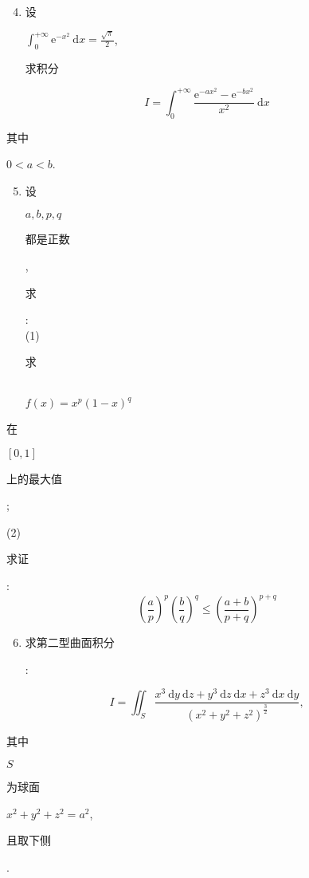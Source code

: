 \documentclass[10pt]{article}
\begin{document}
\begin{enumerate}
  \setcounter{enumi}{3}
  \item \begin{CJK}{UTF8}{mj}设\end{CJK} $\int_{0}^{+\infty} \mathrm{e}^{-x^{2}} \mathrm{~d} x=\frac{\sqrt{\pi}}{2}$, \begin{CJK}{UTF8}{mj}求积分\end{CJK}
\end{enumerate}
$$
I=\int_{0}^{+\infty} \frac{\mathrm{e}^{-a x^{2}}-\mathrm{e}^{-b x^{2}}}{x^{2}} \mathrm{~d} x
$$
\begin{CJK}{UTF8}{mj}其中\end{CJK} $0<a<b$.

\begin{enumerate}
  \setcounter{enumi}{4}
  \item \begin{CJK}{UTF8}{mj}设\end{CJK} $a, b, p, q$ \begin{CJK}{UTF8}{mj}都是正数\end{CJK}, \begin{CJK}{UTF8}{mj}求\end{CJK}:\\
(1) \begin{CJK}{UTF8}{mj}求\end{CJK}\\
$f(x)=x^{p}(1-x)^{q}$
\end{enumerate}
\begin{CJK}{UTF8}{mj}在\end{CJK} $[0,1]$ \begin{CJK}{UTF8}{mj}上的最大值\end{CJK};

(2) \begin{CJK}{UTF8}{mj}求证\end{CJK}:
$$
\left(\frac{a}{p}\right)^{p}\left(\frac{b}{q}\right)^{q} \leqslant\left(\frac{a+b}{p+q}\right)^{p+q}
$$

\begin{enumerate}
  \setcounter{enumi}{5}
  \item \begin{CJK}{UTF8}{mj}求第二型曲面积分\end{CJK}:
\end{enumerate}
$$
I=\iint_{S} \frac{x^{3} \mathrm{~d} y \mathrm{~d} z+y^{3} \mathrm{~d} z \mathrm{~d} x+z^{3} \mathrm{~d} x \mathrm{~d} y}{\left(x^{2}+y^{2}+z^{2}\right)^{\frac{3}{2}}},
$$
\begin{CJK}{UTF8}{mj}其中\end{CJK} $S$ \begin{CJK}{UTF8}{mj}为球面\end{CJK} $x^{2}+y^{2}+z^{2}=a^{2}$, \begin{CJK}{UTF8}{mj}且取下侧\end{CJK}.
\end{document}
